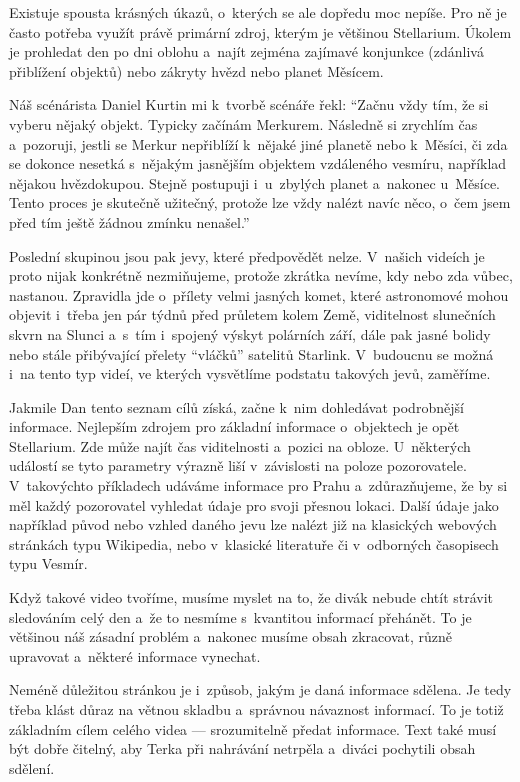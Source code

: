 \documentclass[12pt,a4paper,titlepage]{article}
\begin{document}
Existuje spousta krásných úkazů, o~kterých se ale dopředu moc nepíše. Pro ně je často potřeba využít právě primární zdroj, kterým je většinou Stellarium. Úkolem je prohledat den po dni oblohu a~najít zejména zajímavé konjunkce (zdánlivá přiblížení objektů) nebo zákryty hvězd nebo planet Měsícem.\@ 

Náš scénárista Daniel Kurtin mi k~tvorbě scénáře řekl: \enquote{Začnu vždy tím, že si vyberu nějaký objekt. Typicky začínám Merkurem. Následně si zrychlím čas a~pozoruji, jestli se Merkur nepřiblíží k~nějaké jiné planetě nebo k~Měsíci, či zda se dokonce nesetká s~nějakým jasnějším objektem vzdáleného vesmíru, například nějakou hvězdokupou. Stejně postupuji i~u~zbylých planet a~nakonec u~Měsíce. Tento proces je skutečně užitečný, protože lze vždy nalézt navíc něco, o~čem jsem před tím ještě žádnou zmínku nenašel.}

Poslední skupinou jsou pak jevy, které předpovědět nelze. V~našich videích je proto nijak konkrétně nezmiňujeme, protože zkrátka nevíme, kdy nebo zda vůbec, nastanou. Zpravidla jde o~přílety velmi jasných komet, které astronomové mohou objevit i~třeba jen pár týdnů před průletem kolem Země,  viditelnost slunečních skvrn na Slunci a~s~tím i~spojený výskyt polárních září, dále pak jasné bolidy nebo stále přibývající přelety \enquote{vláčků} satelitů Starlink. V~budoucnu se možná i~na tento typ videí, ve kterých vysvětlíme podstatu takových jevů, zaměříme. 

Jakmile Dan tento seznam cílů získá, začne k~nim dohledávat podrobnější informace. Nejlepším zdrojem pro základní informace o~objektech je opět Stellarium. Zde může najít čas viditelnosti a~pozici na obloze. U~některých událostí se tyto parametry výrazně liší v~závislosti na poloze pozorovatele. V~takovýchto příkladech udáváme informace pro Prahu a~zdůrazňujeme, že by si měl každý pozorovatel vyhledat údaje pro svoji přesnou lokaci. Další údaje jako například původ nebo vzhled daného jevu lze nalézt již na klasických webových stránkách typu Wikipedia, nebo v~klasické literatuře či v~odborných časopisech typu Vesmír.

Když takové video tvoříme, musíme myslet na to, že divák nebude chtít strávit sledováním celý den a~že to nesmíme s~kvantitou informací přehánět. To je většinou náš zásadní problém a~nakonec musíme obsah zkracovat, různě upravovat a~některé informace vynechat. 

Neméně důležitou stránkou je i~způsob, jakým je daná informace sdělena. Je tedy třeba klást důraz na větnou skladbu a~správnou návaznost informací. To je totiž základním cílem celého videa --- srozumitelně předat informace. Text také musí být dobře čitelný, aby Terka při nahrávání netrpěla a~diváci pochytili obsah sdělení.
\end{document}
